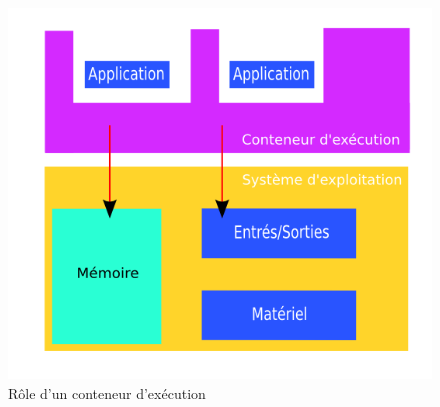 {  \begin{figure}[h]
    \begin{center}
      \includegraphics[scale=0.3]{img/execution-container.png}
      \caption{Rôle d'un conteneur d'exécution}
      \label{execution-container}
    \end{center}
  \end{figure}
}



